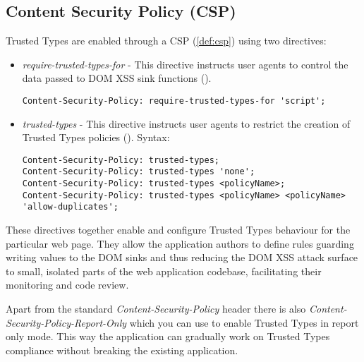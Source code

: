 \subsection{Content Security Policy (CSP)}
\label{csp}

Trusted Types are enabled through a CSP (\ref{def:csp}) using two directives:

\begin{itemize}
  \item \textit{require-trusted-types-for} - This directive instructs user agents to control the
        data passed to DOM XSS sink functions (\cite{mdn:require-trusted-types-for}).

        \bigskip
        \begin{lstlisting}[language={}, caption=Syntax of require-trusted-types-for directive]
Content-Security-Policy: require-trusted-types-for 'script';\end{lstlisting}

  \item \textit{trusted-types} - This directive instructs user agents to restrict the creation of
        Trusted Types policies (\cite{mdn:trusted-types}). Syntax:

        \bigskip
        \begin{lstlisting}[language={}, caption=Syntax of trusted-types directive]
Content-Security-Policy: trusted-types;
Content-Security-Policy: trusted-types 'none';
Content-Security-Policy: trusted-types <policyName>;
Content-Security-Policy: trusted-types <policyName> <policyName> 'allow-duplicates';\end{lstlisting}

\end{itemize}

These directives together enable and configure Trusted Types behaviour for the particular web page.
They allow the application authors to define rules guarding writing values to the DOM sinks and thus
reducing the DOM XSS attack surface to small, isolated parts of the web application codebase,
facilitating their monitoring and code review.

Apart from the standard \textit{Content-Security-Policy} header there is also
\textit{Content-Security-Policy-Report-Only} which you can use to enable Trusted Types in report
only mode. This way the application can gradually work on Trusted Types compliance without breaking
the existing application.

